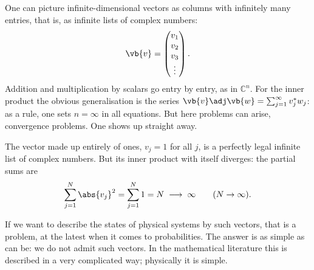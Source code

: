 \begin{vertiefung}[id=c03.v1,
    titel={Columns with infinitely many entries},
    wozu={If one simply sets $n = \infty$ in the formulas of Section~\ref{c03.s2}, the inner
      product can diverge. This block shows how to repair it: one admits only vectors whose
      inner product with themselves is finite. These vectors form the space $\elltwo$.},
    voraussetzung={Section~\ref{c03.s2}; convergent series. The core up to Chapter~4 does not
      need this block.},
    zurueck={A vector with infinitely many entries is admitted if the sum of the squared
      moduli of its entries is finite. For such vectors the inner product is defined as an
      infinite sum and obeys the same rules as in $\mathbb{C}^n$.}]
  One can picture infinite-dimensional vectors as columns with infinitely many entries, that
  is, as infinite lists of complex numbers:
  \begin{equation*}
    \vb{v} = \begin{pmatrix} v_1 \\ v_2 \\ v_3 \\ \vdots \end{pmatrix} .
  \end{equation*}
  Addition and multiplication by scalars go entry by entry, as in $\mathbb{C}^n$. For the
  inner product the obvious generalisation is the series
  $\vb{v}\adj\vb{w} = \sum_{j=1}^{\infty} v_j^* w_j$: as a rule, one sets $n = \infty$ in all
  equations. But here problems can arise, convergence problems. One shows up straight away.

  \begin{example}\label{c03.ex.einsen}
    The vector made up entirely of ones, $v_j = 1$ for all $j$, is a perfectly legal
    infinite list of complex numbers. But its inner product with itself diverges: the
    partial sums are
    \begin{equation}\label{c03.eq.einsen}
      \sum_{j=1}^{N} \abs{v_j}^2 = \sum_{j=1}^{N} 1 = N \;\longrightarrow\; \infty
      \qquad (N \to \infty) .
    \end{equation}
  \end{example}

  If we want to describe the states of physical systems by such vectors, that is a problem,
  at the latest when it comes to probabilities. The answer is as simple as can be: we do not
  admit such vectors. In the mathematical literature this is described in a very complicated
  way; physically it is simple.


\end{vertiefung}

